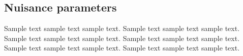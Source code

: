
\subsection{Nuisance parameters}
Sample text sample text sample text. Sample text sample text sample text.
Sample text sample text sample text. Sample text sample text sample text.
Sample text sample text sample text. Sample text sample text sample text.

